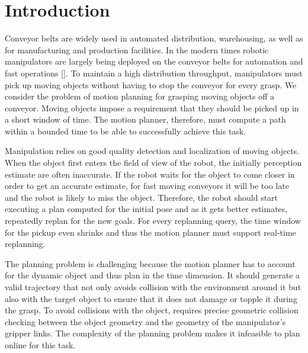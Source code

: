 \documentclass[conference]{IEEEtran}
\begin{document}
\IEEEpeerreviewmaketitle

\section{Introduction}

Conveyor belts are widely used in automated distribution, warehousing, as well as for manufacturing and production facilities. In the modern times robotic manipulators are largely being deployed on the conveyor belts for automation and fast operations []. To maintain a high distribution throughput, manipulators must pick up moving objects without having to stop the conveyor for every grasp. We consider the problem of motion planning for grasping moving objects off a conveyor. Moving objects impose a requirement that they should be picked up in a short window of time. The motion planner, therefore, must compute a path within a bounded time to be able to successfully achieve this task.

Manipulation relies on good quality detection and localization of moving objects. When the object first enters the field of view of the robot, the initially perception estimate are often inaccurate.  If the robot waits for the object to come closer in order to get an accurate estimate, for fast moving conveyors it will be too late and the robot is likely to miss the object. Therefore, the robot should start executing a plan computed for the initial pose and as it gets better estimates, repeatedly replan for the new goals. For every replanning query, the time window for the pickup even shrinks and thus the motion planner must support real-time replanning.

The planning problem is challenging because the motion planner has to account for the dynamic object and thus plan in the time dimension. It should generate a valid trajectory that not only avoids collision with the environment around it but also with the target object to ensure that it does not damage or topple it during the grasp. To avoid collisions with the object, requires precise geometric collision checking between the object geometry and the geometry of the manipulator's gripper links. The complexity of the planning problem makes it infeasible to plan online for this task.
\end{document}
